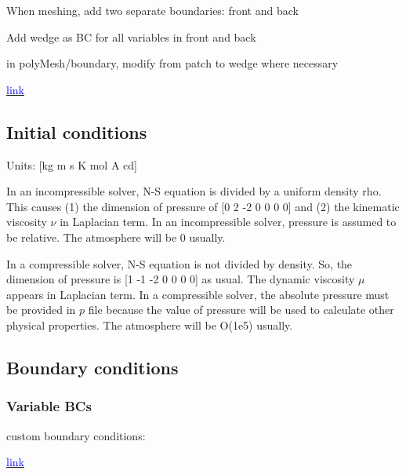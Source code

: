\documentclass[a4paper, 12pt]{article}
\numberwithin{equation}{section}
\newcommand{\code}{\fontfamily{pcr}\selectfont}
\newcommand{\blue}[1]{\textcolor{blue}{#1}}
\begin{document}
            When meshing, add two separate boundaries: front and back

            Add {\code wedge} as BC for all variables in front and back

            in {\code polyMesh/boundary}, modify from {\code patch} to {\code wedge} where necessary

            \href{https://www.youtube.com/watch?v=MUGnlYncqck}{\blue{link}}

            \begin{center}
            \end{center}

    \subsection{Initial conditions}

        Units: [kg m s K mol A cd]

        In an incompressible solver, N-S equation is divided by a uniform density rho. This causes (1) the dimension of pressure of [0 2 -2 0 0 0 0] and (2) the kinematic viscosity $\nu$ in Laplacian term. In an incompressible solver, pressure is assumed to be relative. The atmosphere will be 0 usually.

        In a compressible solver, N-S equation is not divided by density. So, the dimension of pressure is [1 -1 -2 0 0 0 0] as usual. The dynamic viscosity $\mu$ appears in Laplacian term. In a compressible solver, the absolute pressure must be provided in $p$ file because the value of pressure will be used to calculate other physical properties. The atmosphere will be O(1e5) usually.

    \subsection{Boundary conditions}

        \subsubsection{Variable BCs}

            custom boundary conditions:

            \href{
            https://www.youtube.com/watch?v=3zcTxGHxuok
            }{\blue{link}}
\end{document}
